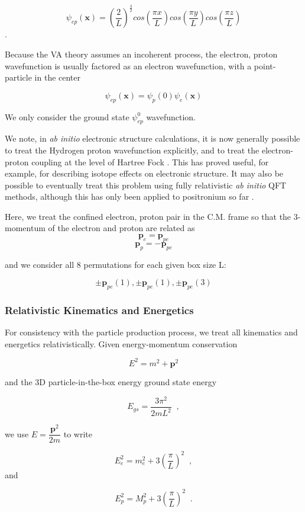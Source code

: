 \documentclass[%
 aip,
 jmp,%
 amsmath,amssymb,
 reprint,%
]{revtex4-1}
\begin{document}
$$\psi_{ep}(\mathbf{x})=\left(\dfrac{2}{L}\right)^{\frac{3}{2}}cos\left(\dfrac{\pi x}{L}\right)cos\left(\dfrac{\pi y}{L}\right)cos\left(\dfrac{\pi z}{L}\right)$$.

Because the VA theory assumes an incoherent process, the electron, proton wavefunction is usually factored as an electron wavefunction, with a point-particle in the center

$$\psi_{ep}(\mathbf{x})=\psi_{p}(0)\psi_{e}(\mathbf{x})$$

We only consider the ground state $\psi_{ep}^{0}$ wavefunction.

We note, in \emph{ab initio} electronic structure calculations, it is now generally possible to treat the Hydrogen proton wavefunction explicitly, and to treat the electron-proton coupling at the level of Hartree Fock \cite{martin}.  This has proved useful, for example, for describing isotope effects on electronic structure.  It may also be possible to eventually treat this problem using fully relativistic \emph{ab initio} QFT methods, although this has only been applied to positronium so far \cite{positroniumQFT}.

Here, we treat the confined electron, proton pair in the C.M. frame so that the 3-momentum of the electron and proton are related as
$$\mathbf{p}_{e}=\mathbf{p}_{pe}$$
$$\mathbf{p}_{p}=-\mathbf{p}_{pe}$$

and we consider all 8 permutations for each given box size L:

$$\pm\mathbf{p}_{pe}(1), \pm\mathbf{p}_{pe}(1), \pm\mathbf{p}_{pe}(3)$$

\subsubsection{Relativistic Kinematics and Energetics}
For consistency with the particle production process, we treat all kinematics and energetics relativistically.  Given energy-momentum conservation

$$E^{2}=m^{2}+\mathbf{p}^{2}$$

and the 3D particle-in-the-box energy ground state energy 

$$E_{gs}=\dfrac{3\pi^{2}}{2mL^{2}}\;\;,$$

we use $E=\dfrac{\mathbf{p}^{2}}{2m}$ to write

$$E^{2}_{e}=m^{2}_{e}+3\left(\dfrac{\pi}{L}\right)^{2}\;\;,$$ and

$$E^{2}_{p}=M^{2}_{p}+3\left(\dfrac{\pi}{L}\right)^{2}\;\;.$$
\end{document}
